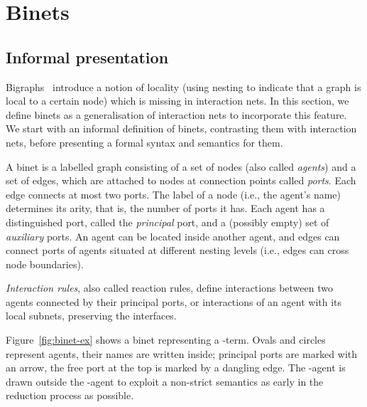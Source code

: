 \documentclass[copyright,creativecommons]{eptcs}
\begin{document}
\section{Binets}
\label{sec:binets}

\subsection{Informal presentation}

Bigraphs~\cite{jensen03bigraphs} introduce a notion of locality (using
nesting to indicate that a graph is local to a certain node) which is
missing in interaction nets. In this section, we define binets as a
generalisation of interaction nets to incorporate this feature.
We start with an informal definition of binets, contrasting them with interaction nets,
before presenting a formal syntax and semantics for them.

A binet is a labelled graph consisting of a set of nodes (also called
\emph{agents}) and a set of edges, which are attached to nodes at
connection points called \emph{ports}.  Each edge connects at most two
ports.  The label of a node (i.e., the agent's name) determines its
arity, that is, the number of ports it has. Each agent has a
distinguished port, called the \emph{principal} port, and a (possibly
empty) set of \emph{auxiliary} ports.  An agent can be located inside
another agent, and edges can connect ports of agents situated at
different nesting levels (i.e., edges can cross node boundaries).

\emph{Interaction rules}, also called reaction rules, define interactions
between two agents connected by their principal ports, or interactions of an agent with its local subnets, preserving
the interfaces.

Figure~\ref{fig:binet-ex} shows a binet representing a -term.
Ovals and circles represent agents, their names are written inside;
principal ports are marked with an arrow, the free port at the top is
marked by a dangling edge. The -agent is drawn outside the
-agent to exploit a non-strict semantics as early in the
reduction process as possible.
\end{document}
